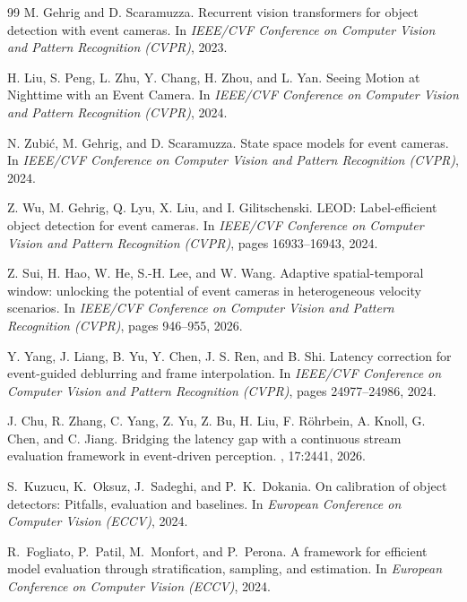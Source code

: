 \documentclass[10pt,twocolumn,letterpaper]{article}
\begin{document}
{\begin{thebibliography}{99}
M. Gehrig and D. Scaramuzza.
\newblock Recurrent vision transformers for object detection with event cameras.
\newblock In {\em IEEE/CVF Conference on Computer Vision and Pattern Recognition
(CVPR)}, 2023.

H. Liu, S. Peng, L. Zhu, Y. Chang, H. Zhou, and L. Yan.
\newblock Seeing Motion at Nighttime with an Event Camera.
\newblock In {\em IEEE/CVF Conference on Computer Vision and Pattern Recognition
(CVPR)}, 2024.

N. Zubi\'c, M. Gehrig, and D. Scaramuzza.
\newblock State space models for event cameras.
\newblock In {\em IEEE/CVF Conference on Computer Vision and Pattern Recognition
(CVPR)}, 2024.

Z. Wu, M. Gehrig, Q. Lyu, X. Liu, and I. Gilitschenski.
\newblock LEOD: Label-efficient object detection for event cameras.
\newblock In {\em IEEE/CVF Conference on Computer Vision and Pattern Recognition
(CVPR)}, pages 16933--16943, 2024.

Z. Sui, H. Hao, W. He, S.-H. Lee, and W. Wang.
\newblock Adaptive spatial-temporal window: unlocking the potential of event
cameras in heterogeneous velocity scenarios.
\newblock In {\em IEEE/CVF Conference on Computer Vision and Pattern Recognition
(CVPR)}, pages 946--955, 2026.

Y. Yang, J. Liang, B. Yu, Y. Chen, J. S. Ren, and B. Shi.
\newblock Latency correction for event-guided deblurring and frame interpolation.
\newblock In {\em IEEE/CVF Conference on Computer Vision and Pattern Recognition
(CVPR)}, pages 24977--24986, 2024.

J. Chu, R. Zhang, C. Yang, Z. Yu, Z. Bu, H. Liu, F. R\"ohrbein, A. Knoll,
G. Chen, and C. Jiang.
\newblock Bridging the latency gap with a continuous stream evaluation framework
in event-driven perception.
, 17:2441, 2026.

S.~Kuzucu, K.~Oksuz, J.~Sadeghi, and P.~K.~Dokania.
\newblock On calibration of object detectors: Pitfalls, evaluation and baselines.
\newblock In {\em European Conference on Computer Vision (ECCV)}, 2024.

R.~Fogliato, P.~Patil, M.~Monfort, and P.~Perona.
\newblock A framework for efficient model evaluation through stratification, sampling, and
estimation.
\newblock In {\em European Conference on Computer Vision (ECCV)}, 2024.


\end{thebibliography}}
\end{document}
